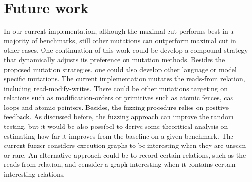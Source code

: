 \section{Future work}

In our current implementation, although the maximal cut performs best in a majority of benchmarks, still other mutations can outperform maximal cut in other cases. One continuation of this work could be develop a compound strategy that dynamically adjusts its preference on mutation methods. Besides the proposed mutation strategies, one could also develop other language or model specific mutations. The current implementation mutates the reads-from relation, including read-modify-writes. There could be other mutations targeting on relations such as modification-orders or primitives such as atomic fences, cas loops and atomic pointers. Besides, the fuzzing procedure relies on positive feedback. As discussed before, the fuzzing approach can improve the random testing, but it would be also possibel to derive some theoritical analysis on estimating how far it improves from the baseline on a given benchmark. The current fuzzer considers execution graphs to be interesting when they are unseen or rare. An alternative approach could be to record certain relations, such as the reads-from relation, and consider a graph interesting when it contains certain interesting relations.

